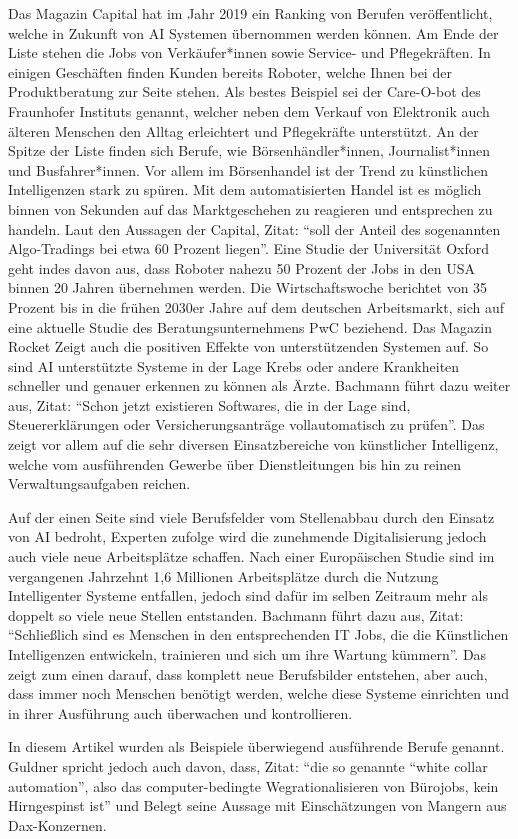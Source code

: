 Das Magazin Capital hat im Jahr 2019 ein Ranking von Berufen veröffentlicht, welche in Zukunft von \ac{AI} Systemen übernommen werden können. Am Ende der Liste stehen die Jobs von Verkäufer*innen sowie Service- und Pflegekräften. \cite{jerzy_2019} In einigen Geschäften finden Kunden bereits Roboter, welche Ihnen bei der Produktberatung zur Seite stehen. Als bestes Beispiel sei der Care-O-bot des Fraunhofer Instituts genannt, welcher neben dem Verkauf von Elektronik auch älteren Menschen den Alltag erleichtert und Pflegekräfte unterstützt. \cite{jerzy_2019}
An der Spitze der Liste finden sich Berufe, wie Börsenhändler*innen, Journalist*innen und Busfahrer*innen. \cite{jerzy_2019} Vor allem im Börsenhandel ist der Trend zu künstlichen Intelligenzen stark zu spüren. Mit dem automatisierten Handel ist es möglich binnen von Sekunden auf das Marktgeschehen zu reagieren und entsprechen zu handeln. \cite{jerzy_2019} Laut den Aussagen der Capital, Zitat: \enquote{soll der Anteil des sogenannten Algo-Tradings bei etwa 60 Prozent liegen}. \cite{jerzy_2019} Eine Studie der Universität Oxford geht indes davon aus, dass Roboter nahezu 50 Prozent der Jobs in den USA binnen 20 Jahren übernehmen werden. \cite{bachmann_2020} Die Wirtschaftswoche berichtet von 35 Prozent bis in die frühen 2030er Jahre auf dem deutschen Arbeitsmarkt, sich auf eine aktuelle Studie des Beratungsunternehmens PwC beziehend. \cite{guldner_2017}
Das Magazin Rocket Zeigt auch die positiven Effekte von unterstützenden Systemen auf. So sind \ac{AI} unterstützte Systeme in der Lage Krebs oder andere Krankheiten schneller und genauer erkennen zu können als Ärzte.  \cite{bachmann_2020} Bachmann führt dazu weiter aus, Zitat: \enquote{Schon jetzt existieren Softwares, die in der Lage sind, Steuererklärungen oder Versicherungsanträge vollautomatisch zu prüfen}. \cite{bachmann_2020} Das zeigt vor allem auf die sehr diversen Einsatzbereiche von künstlicher Intelligenz, welche vom ausführenden Gewerbe über Dienstleitungen bis hin zu reinen Verwaltungsaufgaben reichen.

Auf der einen Seite sind viele Berufsfelder vom Stellenabbau durch den Einsatz von \ac{AI} bedroht, Experten zufolge wird die zunehmende Digitalisierung jedoch auch viele neue Arbeitsplätze schaffen. \cite{bachmann_2020} Nach einer Europäischen Studie sind im vergangenen Jahrzehnt 1,6 Millionen Arbeitsplätze durch die Nutzung Intelligenter Systeme entfallen, jedoch sind dafür im selben Zeitraum mehr als doppelt so viele neue Stellen entstanden. \cite{bachmann_2020} Bachmann führt dazu aus, Zitat: \enquote{Schließlich sind es Menschen in den entsprechenden IT Jobs, die die Künstlichen Intelligenzen entwickeln, trainieren und sich um ihre Wartung kümmern}. \cite{bachmann_2020} Das zeigt zum einen darauf, dass komplett neue Berufsbilder entstehen, aber auch, dass immer noch Menschen benötigt werden, welche diese Systeme einrichten und in ihrer Ausführung auch überwachen und kontrollieren.

In diesem Artikel wurden als Beispiele überwiegend ausführende Berufe genannt. Guldner spricht jedoch auch davon, dass, Zitat: \enquote{die so genannte “white collar automation”, also das computer-bedingte Wegrationalisieren von Bürojobs, kein Hirngespinst ist} und Belegt seine Aussage mit Einschätzungen von Mangern aus Dax-Konzernen. \cite{guldner_2017}